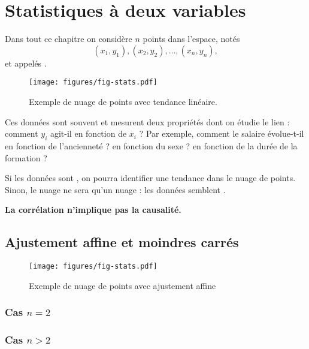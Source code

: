 
\chapter{Statistiques à deux variables}

Dans tout ce chapitre on considère $n$ points dans l'espace, notés 
	\[ (x_1, y_1), (x_2, y_2), \dots, (x_n, y_n), \]
et appelés .


\begin{figure}
	\centering
	\texttt{[image: figures/fig-stats.pdf]}
	\caption{Exemple de nuage de points avec tendance linéaire.}
\end{figure}

Ces données sont souvent  et mesurent deux propriétés dont on étudie le lien : comment $y_i$ agit-il en fonction de $x_i$ ?
Par exemple, comment le salaire évolue-t-il en fonction de l'ancienneté ? en fonction du sexe ? en fonction de la durée de la formation ?

Si les données sont , on pourra identifier une tendance dans le nuage de points.
Sinon, le nuage ne sera qu'un nuage : les données semblent .

\textbf{\warning La corrélation n'implique pas la causalité.}

\section{Ajustement affine et moindres carrés}

\begin{figure}
	\centering
	\texttt{[image: figures/fig-stats.pdf]}
	\caption{Exemple de nuage de points avec ajustement affine}
\end{figure}


\subsection{Cas $n=2$}


\subsection{Cas $n>2$}


